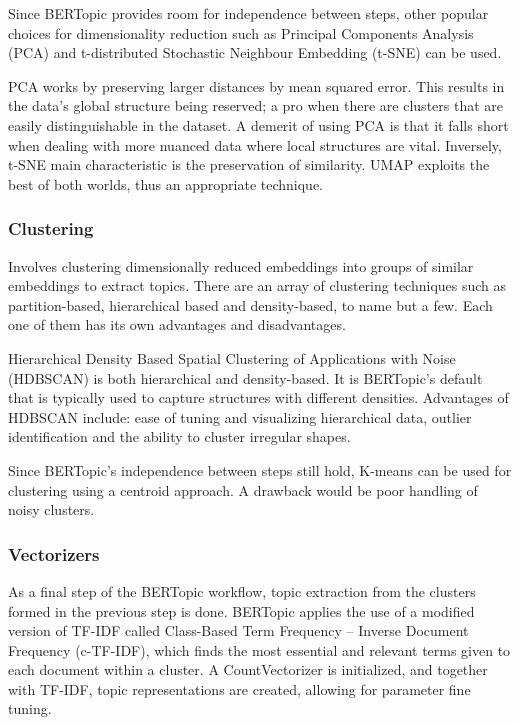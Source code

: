 \documentclass{article}
\theoremstyle{mytheoremstyle}
\theoremstyle{mytheoremstyle}
\theoremstyle{myproblemstyle}
\begin{document}
    Since BERTopic provides room for independence between steps, other popular choices for dimensionality reduction such as Principal Components Analysis (PCA) and t-distributed Stochastic Neighbour Embedding (t-SNE) can be used.

    PCA works by preserving larger distances by mean squared error. This results in the data’s global structure being reserved; a pro when there are clusters that are easily distinguishable in the dataset. A demerit of using PCA is that it falls short when dealing with more nuanced data where local structures are vital. Inversely, t-SNE main characteristic is the preservation of similarity. UMAP exploits the best of both worlds, thus an appropriate technique.

    \subsubsection{Clustering}

    Involves clustering dimensionally reduced embeddings into groups of similar embeddings to extract topics. There are an array of clustering techniques such as partition-based, hierarchical based and density-based, to name but a few. Each one of them has its own advantages and disadvantages.

    Hierarchical Density Based Spatial Clustering of Applications with Noise (HDBSCAN) is both hierarchical and density-based. It is BERTopic’s default that is typically used to capture structures with different densities. Advantages of HDBSCAN include: ease of tuning and visualizing hierarchical data, outlier identification and the ability to cluster irregular shapes. 

    Since BERTopic’s independence between steps still hold, K-means can be used for clustering using a centroid approach. A drawback would be poor handling of noisy clusters.

    \subsubsection{Vectorizers}

    As a final step of the BERTopic workflow, topic extraction from the clusters formed in the previous step is done. BERTopic applies the use of a modified version of TF-IDF called Class-Based Term Frequency – Inverse Document Frequency (c-TF-IDF), which finds the most essential and relevant terms given to each document within a cluster. A CountVectorizer is initialized, and together with TF-IDF, topic representations are created, allowing for parameter fine tuning.
\end{document}

